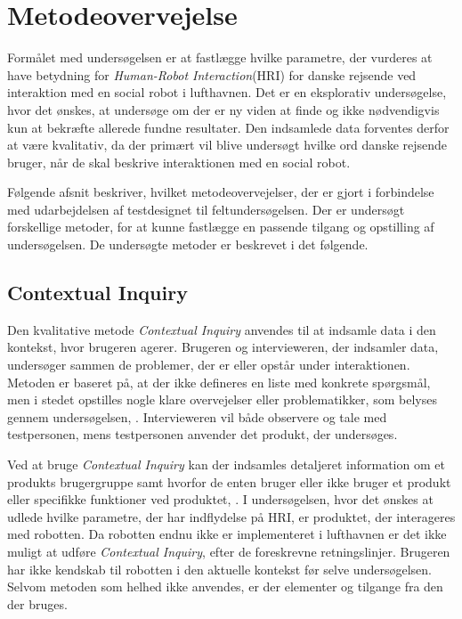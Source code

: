 \section{Metodeovervejelse}
\label{ParametreMetodeovervejelser}
%
Formålet med undersøgelsen er at fastlægge hvilke parametre, der vurderes at have betydning for \textit{Human-Robot Interaction}(HRI) for danske rejsende ved interaktion med en social robot i lufthavnen. Det er en eksplorativ undersøgelse, hvor det ønskes, at undersøge om der er ny viden at finde og ikke nødvendigvis kun at bekræfte allerede fundne resultater. Den indsamlede data forventes derfor at være kvalitativ, da der primært vil blive undersøgt hvilke ord danske rejsende bruger, når de skal beskrive interaktionen med en social robot. 

Følgende afsnit beskriver, hvilket metodeovervejelser, der er gjort i forbindelse med udarbejdelsen af testdesignet til feltundersøgelsen. Der er undersøgt forskellige metoder, for at kunne fastlægge en passende tilgang og opstilling af undersøgelsen. De undersøgte metoder er beskrevet i det følgende. 

\subsection{Contextual Inquiry}
\label{ParametreContextualInquiry}
%
Den kvalitative metode \textit{Contextual Inquiry} anvendes til at indsamle data i den kontekst, hvor brugeren agerer. Brugeren og intervieweren, der indsamler data, undersøger sammen de problemer, der er eller opstår under interaktionen. Metoden er baseret på, at der ikke defineres en liste med konkrete spørgsmål, men i stedet opstilles nogle klare overvejelser eller problematikker, som belyses gennem undersøgelsen, \parencite[s. 1]{PDF:UsingCIToLearn}. Intervieweren vil både observere og tale med testpersonen, mens testpersonen anvender det produkt, der undersøges. 

Ved at bruge \textit{Contextual Inquiry} kan der indsamles detaljeret information om et produkts brugergruppe samt hvorfor de enten bruger eller ikke bruger et produkt eller specifikke funktioner ved produktet, \parencite[s. 2]{PDF:UsingCIToLearn}. \blankline
%
I undersøgelsen, hvor det ønskes at udlede hvilke parametre, der har indflydelse på HRI, er produktet, der interageres med robotten. Da robotten endnu ikke er implementeret i lufthavnen er det ikke muligt at udføre \textit{Contextual Inquiry}, efter de foreskrevne retningslinjer. Brugeren har ikke kendskab til robotten i den aktuelle kontekst før selve undersøgelsen. Selvom metoden som helhed ikke anvendes, er der elementer og tilgange fra den der bruges.

